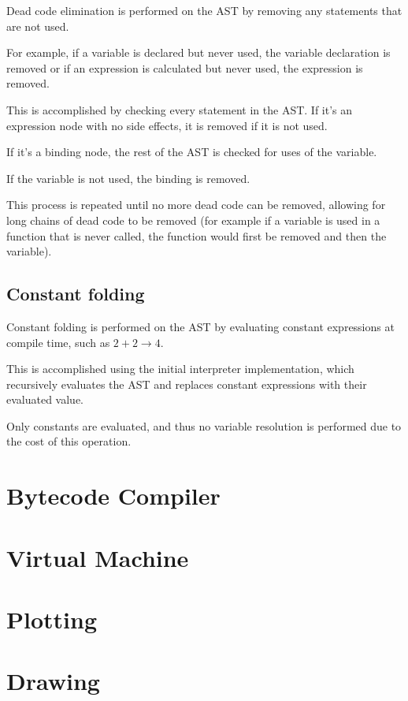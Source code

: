 \documentclass[a4paper, oneside, 11pt]{report}
\newcommand{\ra}{\rightarrow}
\begin{document}
Dead code elimination is performed on the AST by removing any statements that are not used.

For example, if a variable is declared but never used, the variable declaration is removed or if an expression is
calculated but never used, the expression is removed.

This is accomplished by checking every statement in the AST.
If it's an expression node with no side effects, it is removed if it is not used.

If it's a binding node, the rest of the AST is checked for uses of the variable.

If the variable is not used, the binding is removed.

This process is repeated until no more dead code can be removed, allowing for long chains of dead code to be 
removed (for example if a variable is used in a function that is never called, the function would first be removed
and then the variable).

\subsection{Constant folding}\label{subsec:constant-folding}

Constant folding is performed on the AST by evaluating constant expressions at compile time, such as $2 + 2 \ra 4$.

This is accomplished using the initial interpreter implementation, which recursively evaluates the AST and replaces
constant expressions with their evaluated value.

Only constants are evaluated, and thus no variable resolution is performed due to the cost of this operation.

\section{Bytecode Compiler}\label{sec:compiler}

\section{Virtual Machine}\label{sec:virtual-machine}

\section{Plotting}\label{sec:plotting}

\section{Drawing}\label{sec:drawing}
\end{document}
